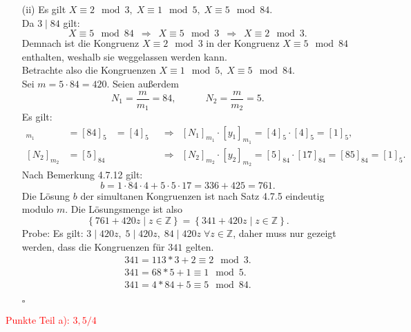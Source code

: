 \documentclass[12pt]{article}
\newcommand{\corr}[1]{\textcolor{red}{#1}}
\newcommand{\QED}{\begin{flushright} $\square$ \end{flushright}}
\newcommand{\df}{\enspace\Longrightarrow\enspace}
\begin{document}
\begin{enumerate}
\begin{enumerate}
		\item[(ii)] Es gilt $X\equiv2\mod3,\;X\equiv1\mod5,\;X\equiv5\mod84$. \\
		Da $3\mid84$ gilt:
		$$X\equiv5\mod84\df X\equiv5\mod3\df X\equiv2\mod3.$$
		Demnach ist die Kongruenz $X\equiv2\mod3$ in der Kongruenz $X\equiv5\mod84$ enthalten, weshalb sie weggelassen werden kann. \\
		
		Betrachte also die Kongruenzen $X\equiv1\mod5,\;X\equiv5\mod84$. \\
		Sei $m=5\cdot84=420$.
		Seien außerdem $$N_1=\frac{m}{m_1}=84,\quad\quad\quad N_2=\frac{m}{m_2}=5.$$
		Es gilt:
		\begin{align*}
			[N_1]_{m_1}&=[84]_5&=[4]_5&\df[N_1]_{m_1}\cdot[y_1]_{m_1}=[4]_5\cdot[4]_5=[1]_5, \\
			[N_2]_{m_2}&=[5]_{84}& &\df[N_2]_{m_2}\cdot[y_2]_{m_2}=[5]_{84}\cdot[17]_{84}=[85]_{84}=[1]_5.
		\end{align*}
		Nach Bemerkung 4.7.12 gilt:
		$$b=1\cdot84\cdot4+5\cdot5\cdot17=336+425=761.$$
		Die Lösung $b$ der simultanen Kongruenzen ist nach Satz 4.7.5 eindeutig modulo $m$. Die Lösungsmenge ist also
		$$\left\{761+420z\mid z\in\mathbb{Z}\right\}=\left\{341+420z\mid z\in\mathbb{Z}\right\}.$$
		Probe:
		Es gilt: $3\mid 420z,\;5\mid420z,\;84\mid420z\;\forall z\in\mathbb{Z}$, daher muss nur gezeigt werden, dass die Kongruenzen für $341$ gelten. \\
		\begin{align*}
			341 = 113*3+2 \equiv 2\mod3. \\
			341 = 68*5+1 \equiv 1\mod5. \\
			341 = 4*84+5 \equiv 5\mod84.
		\end{align*}
		\QED
	\end{enumerate}
\corr{Punkte Teil a): $3,5/4$}
	

\end{enumerate}
\end{document}
